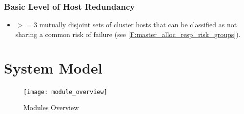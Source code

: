 \documentclass[a4paper, 11pt]{article}
\let\oldsection\section
\renewcommand\section{\clearpage\oldsection}
\begin{document}
\subsubsection{Basic Level of Host Redundancy}
\begin{itemize}
	\item $>= 3$ mutually disjoint sets of \gls{cluster} \glspl{host} that can be classified as not sharing a common risk of failure (see \ref{F:master_alloc_resp_risk_groups}).
\end{itemize}

\section{System Model}
\begin{figure}[H]
\texttt{[image: module\_overview]}
\caption{\mamid Modules Overview}
\end{figure}
\end{document}
